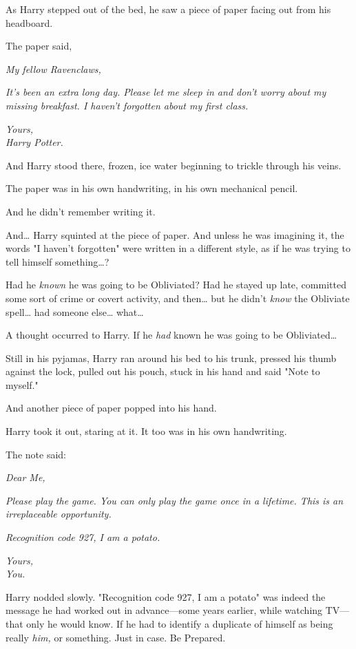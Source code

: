 As Harry stepped out of the bed, he saw a piece of paper facing out from his 
headboard.

The paper said,

\emph{My fellow Ravenclaws,}

\emph{It's been an extra long day. Please let me sleep in and don't worry about 
my missing breakfast. I haven't forgotten about my first class.}

\emph{Yours,\\
Harry Potter.}

And Harry stood there, frozen, ice water beginning to trickle through his veins.

The paper was in his own handwriting, in his own mechanical pencil.

And he didn't remember writing it.

And{\ldots} Harry squinted at the piece of paper. And unless he was imagining 
it, the words "I haven't forgotten" were written in a different style, as if he 
was trying to tell himself something{\ldots}?

Had he \emph{known} he was going to be Obliviated? Had he stayed up late, 
committed some sort of crime or covert activity, and then{\ldots} but he didn't 
\emph{know} the Obliviate spell{\ldots} had someone else{\ldots} what{\ldots}

A thought occurred to Harry. If he \emph{had} known he was going to be 
Obliviated{\ldots}

Still in his pyjamas, Harry ran around his bed to his trunk, pressed his thumb 
against the lock, pulled out his pouch, stuck in his hand and said "Note to 
myself."

And another piece of paper popped into his hand.

Harry took it out, staring at it. It too was in his own handwriting.

The note said:

\emph{Dear Me,}

\emph{Please play the game. You can only play the game once in a lifetime. This 
is an irreplaceable opportunity.}

\emph{Recognition code 927, I am a potato.}

\emph{Yours,\\
You.}

Harry nodded slowly. "Recognition code 927, I am a potato" was indeed the 
message he had worked out in advance---some years earlier, while watching 
TV---that only he would know. If he had to identify a duplicate of himself as 
being really \emph{him,} or something. Just in case. Be Prepared.

